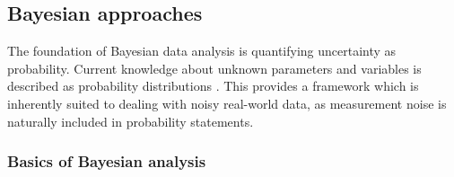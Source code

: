 















\subsection{Bayesian approaches}\label{bayesian-approaches}

The foundation of Bayesian data analysis is quantifying uncertainty as
probability. Current knowledge about unknown parameters and variables is
described as probability distributions \citep{Gelman2013}.
This provides a framework which is inherently suited to dealing with noisy
real-world data, as measurement noise is naturally included in
probability statements.

\subsubsection{Basics of Bayesian analysis}

